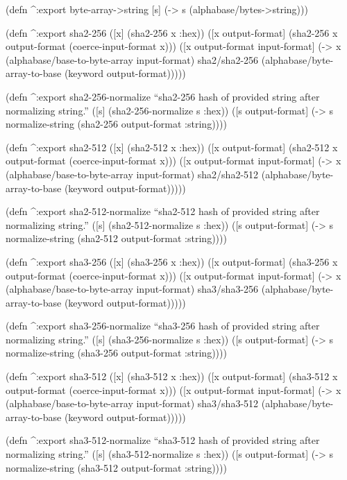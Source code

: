 \documentclass[
]{article}
\begin{document}
(defn \^{}:export byte-array-\textgreater string {[}s{]}
(-\textgreater{} s (alphabase/bytes-\textgreater string)))

(defn \^{}:export sha2-256 ({[}x{]} (sha2-256 x :hex)) ({[}x
output-format{]} (sha2-256 x output-format (coerce-input-format x)))
({[}x output-format input-format{]} (-\textgreater{} x
(alphabase/base-to-byte-array input-format) sha2/sha2-256
(alphabase/byte-array-to-base (keyword output-format)))))

(defn \^{}:export sha2-256-normalize ``sha2-256 hash of provided string
after normalizing string.'' ({[}s{]} (sha2-256-normalize s :hex)) ({[}s
output-format{]} (-\textgreater{} s normalize-string (sha2-256
output-format :string))))

(defn \^{}:export sha2-512 ({[}x{]} (sha2-512 x :hex)) ({[}x
output-format{]} (sha2-512 x output-format (coerce-input-format x)))
({[}x output-format input-format{]} (-\textgreater{} x
(alphabase/base-to-byte-array input-format) sha2/sha2-512
(alphabase/byte-array-to-base (keyword output-format)))))

(defn \^{}:export sha2-512-normalize ``sha2-512 hash of provided string
after normalizing string.'' ({[}s{]} (sha2-512-normalize s :hex)) ({[}s
output-format{]} (-\textgreater{} s normalize-string (sha2-512
output-format :string))))

(defn \^{}:export sha3-256 ({[}x{]} (sha3-256 x :hex)) ({[}x
output-format{]} (sha3-256 x output-format (coerce-input-format x)))
({[}x output-format input-format{]} (-\textgreater{} x
(alphabase/base-to-byte-array input-format) sha3/sha3-256
(alphabase/byte-array-to-base (keyword output-format)))))

(defn \^{}:export sha3-256-normalize ``sha3-256 hash of provided string
after normalizing string.'' ({[}s{]} (sha3-256-normalize s :hex)) ({[}s
output-format{]} (-\textgreater{} s normalize-string (sha3-256
output-format :string))))

(defn \^{}:export sha3-512 ({[}x{]} (sha3-512 x :hex)) ({[}x
output-format{]} (sha3-512 x output-format (coerce-input-format x)))
({[}x output-format input-format{]} (-\textgreater{} x
(alphabase/base-to-byte-array input-format) sha3/sha3-512
(alphabase/byte-array-to-base (keyword output-format)))))

(defn \^{}:export sha3-512-normalize ``sha3-512 hash of provided string
after normalizing string.'' ({[}s{]} (sha3-512-normalize s :hex)) ({[}s
output-format{]} (-\textgreater{} s normalize-string (sha3-512
output-format :string))))
\end{document}
